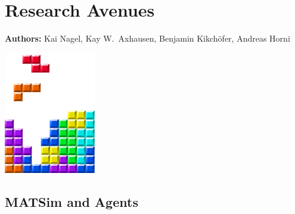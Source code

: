 \chapter{Research Avenues }
\label{ch:researchavenues}

\hfill \textbf{Authors:} Kai Nagel, Kay W.\ Axhausen, Benjamin Kikchöfer, Andreas Horni

\begin{center} \includegraphics[width=0.3\textwidth, angle=0]{figures/MATSimBook.png} \end{center}

\section{MATSim and Agents}

%
%







